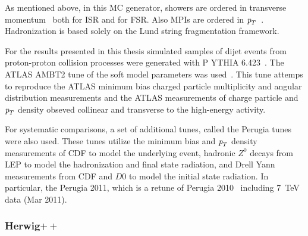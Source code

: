 As mentioned above, in this MC generator, showers are ordered in transverse momentum~\cite{Pythia_partonshowers} both for ISR and for FSR. Also MPIs are ordered in ${\emph{p}_{T}}$~\cite{Pythia_mpi}. Hadronization is based solely on the Lund string fragmentation framework.

For the results presented in this thesis simulated samples of dijet events from proton-proton collision processes were  generated  with P YTHIA 6.423~\cite{PYTHIA6}. The ATLAS AMBT2 tune of the soft model parameters was used~\cite{Pythia_MC11tune}. This tune attemps to reproduce the ATLAS minimum bias charged particle multiplicity and angular distribution measurements and the ATLAS measurements of charge particle and ${\emph{p}_{T}}$ density obseved collinear and transverse to the high-energy activity.

For systematic comparisons, a set of additional tunes, called the Perugia tunes~\cite{Perugia} were also used. These tunes utilize the minimum bias and ${\emph{p}_{T}}$ density measurements of CDF to model the underlying event, hadronic $Z^0$ decays from LEP to model the hadronization and final state radiation, and Drell Yann measurements from CDF and $D0$ to model the initial state radiation.  In particular, the Perugia 2011, which is a retune of Perugia 2010~\cite{Perugia2010} including  7~TeV data (Mar 2011).



\subsubsection{Herwig$++$}

